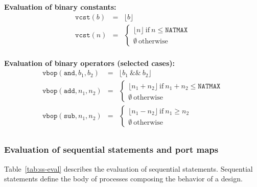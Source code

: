 \begin{table}[!t]
  \vspace{10pt}

  \textbf{Evaluation of binary constants:}
  \begin{eqnarray*}
    \label{eq:vcst}
    \mathtt{vcst}(b) & = & \lfloor{}b\rfloor \\
    \mathtt{vcst}(n) & = & \begin{cases}
                             \lfloor{}n\rfloor~\mathrm{if}~n\le\mathtt{NATMAX} \\
                             \emptyset~\mathrm{otherwise} \end{cases} \\
  \end{eqnarray*}
  
  \textbf{Evaluation of binary operators (selected cases):}
  \begin{eqnarray*}
    \label{eq:vbop}
    \mathtt{vbop}(\mathtt{and}, b_1, b_2) & = & \lfloor{}b_1~\&\&~b_2\rfloor \\
    \mathtt{vbop}(\mathtt{add}, n_1, n_2) & = & \begin{cases}
                                                  \lfloor{}n_1+n_2\rfloor~\mathrm{if}~n_1+n_2\le\mathtt{NATMAX} \\
                                                  \emptyset~\mathrm{otherwise} \end{cases} \\
    \mathtt{vbop}(\mathtt{sub}, n_1, n_2) & = & \begin{cases}
                                                  \lfloor{}n_1-n_2\rfloor~\mathrm{if}~n_1\ge{}n_2 \\
                                                  \emptyset~\mathrm{otherwise}
                                                \end{cases} \\
  \end{eqnarray*}
  
\end{table}

\subsubsection{Evaluation of sequential statements and port maps}
\label{subsubsec:ss-and-port-map-eval}

Table~\ref{tab:ss-eval} describes the evaluation of sequential
statements. Sequential statements define the body of processes
composing the behavior of a \hvhdl{} design.


